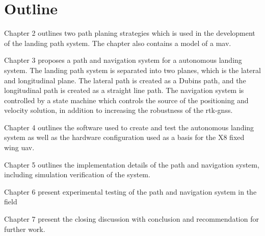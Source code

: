 \section{Outline}
Chapter 2 outlines two path planing strategies which is used in the development of the landing path system. The chapter also contains a model of a \gls{mav}.

Chapter 3 proposes a path and navigation system for a autonomous landing system. The landing path system is separated into two planes, which is the lateral and longitudinal plane. The lateral path is created as a Dubins path, and the longitudinal path is created as a straight line path. The navigation system is controlled by a state machine which controls the source of the positioning and velocity solution, in addition to increasing the robustness of the \gls{rtk-gnss}.

Chapter 4 outlines the software used to create and test the autonomous landing system as well as the hardware configuration used as a basis for the X8 fixed wing \gls{uav}.

Chapter 5 outlines the implementation details of the path and navigation system, including simulation verification of the system.

Chapter 6 present experimental testing of the path and navigation system in the field 

Chapter 7 present the closing discussion with conclusion and recommendation for further work.
\cleardoublepage